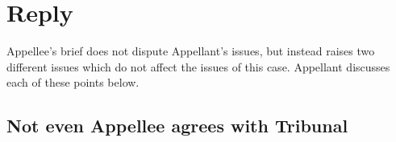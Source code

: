 \documentclass[12pt,\documentclassflag]{michiganCourtOfAppealsBrief}
\begin{document}





\section{Reply}

Appellee's brief does not dispute Appellant's issues, but instead raises two different issues which do not affect the issues of this case. Appellant discusses each of these points below.

\subsection{Not even Appellee agrees with Tribunal}
\end{document}
